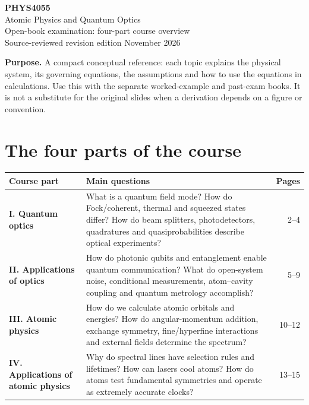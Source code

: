 
\begin{center}
{\color{accent}\Huge\bfseries PHYS4055}\\[3mm]
{\LARGE Atomic Physics and Quantum Optics}\\[2mm]
{\large Open-book examination: four-part course overview}\\[2mm]
{\small Source-reviewed revision edition  November 2026}
\end{center}
\vspace{4mm}
\begin{methodbox}
\textbf{Purpose.} A compact conceptual reference: each topic explains
the physical system, its governing equations, the assumptions and how
to use the equations in calculations. Use this with the separate
worked-example and past-exam books. It is not a substitute for the
original slides when a derivation depends on a figure or convention.
\end{methodbox}
\section*{The four parts of the course}
\begin{tabularx}{\linewidth}{@{}p{.20\linewidth}Xr@{}}
\toprule
Course part & Main questions & Pages\\\midrule
\textbf{I. Quantum optics} & What is a quantum field mode? How do Fock/coherent,
thermal and squeezed states differ? How do beam splitters, photodetectors,
quadratures and quasiprobabilities describe optical experiments? & 2--4\\[2mm]
\textbf{II. Applications of optics} & How do photonic qubits and entanglement
enable quantum communication? What do open-system noise, conditional measurements,
atom--cavity coupling and quantum metrology accomplish? & 5--9\\[2mm]
\textbf{III. Atomic physics} & How do we calculate atomic orbitals and energies?
How do angular-momentum addition, exchange symmetry, fine/hyperfine interactions
and external fields determine the spectrum? & 10--12\\[2mm]
\textbf{IV. Applications of atomic physics} & Why do spectral lines have
selection rules and lifetimes? How can lasers cool atoms? How do atoms test
fundamental symmetries and operate as extremely accurate clocks? & 13--15\\\bottomrule
\end{tabularx}
